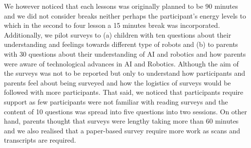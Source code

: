 \documentclass[conference]{IEEEtran}
\begin{document}
We however noticed that each lessons was originally planned to be 90 minutes and we did not consider breaks neither perhaps the participant's energy levels to which in the second to four lesson a 15 minutes break was incorporated.
Additionally, we pilot surveys to (a) children with ten questions about their understanding and feelings towards different type of robots and (b) to parents with 30 questions about their understanding of AI and robotics and how parents were aware of  technological advances in AI and Robotics.
Although the aim of the surveys was not to be reported but only to understand how participants and parents feel about being surveyed and how the logistics of surveys would be followed with more participants.
That said, we noticed that participants require support as few participants were not familiar with reading surveys and the content of 10 questions was spread into five questions into two sessions.
On other hand, parents thought that surveys were lengthy taking more than 60 minutes and we also realised that a paper-based survey require more work as scans and transcripts are required. 


    


\end{document}
